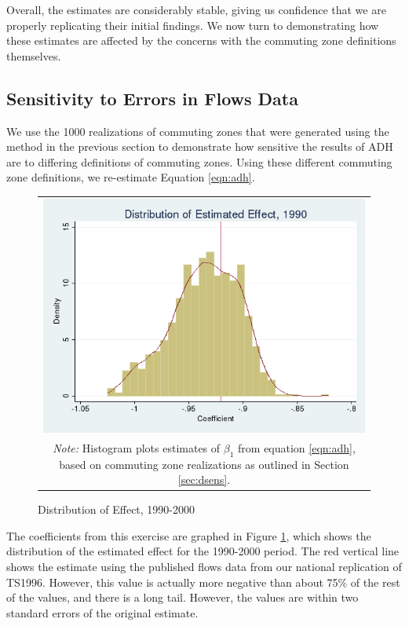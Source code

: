 

Overall, the estimates are considerably stable, giving us confidence that we are properly replicating their initial findings. We now turn to demonstrating how these estimates are affected by the concerns with the commuting zone definitions themselves.

\subsection{Sensitivity to Errors in Flows Data}

We use the 1000 realizations of commuting zones that were generated using the method in the previous section to demonstrate how sensitive the results of ADH are to differing definitions of commuting zones. Using these different commuting zone definitions, we re-estimate Equation \ref{eqn:adh}.

\begin{figure}\centering
\caption{Distribution of Effect, 1990-2000 \label{fig:1990dist}}
\begin{tabular}{c}
\includegraphics[scale=.5]{./figures/1990_distribution.png}\\
\multicolumn{1}{p{4.5in}}{\footnotesize \emph{Note:} Histogram plots estimates of $\beta_1$ from equation \ref{eqn:adh}, based on commuting zone realizations as outlined in Section \ref{sec:dsens}.}
\end{tabular}
\end{figure}

 The coefficients from this exercise are graphed in Figure \ref{fig:1990dist}, which shows the distribution of the estimated effect for the 1990-2000 period. The red vertical line shows the estimate using the published flows data from our national replication of TS1996. However, this value is actually more negative than about 75\% of the rest of the values, and there is a long tail. However, the values are within two standard errors of the original estimate.

